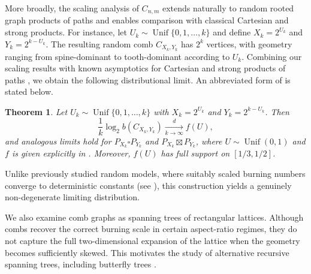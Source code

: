 \documentclass{article}
\def\V#1{{\mathbf #1}}
\def\Unif{\operatorname{Unif}}
\def\B{\operatorname{B}}
\newtheorem{theorem}{Theorem}
\begin{document}
More broadly, the scaling analysis of $C_{n,m}$ extends naturally to random rooted graph products of paths and enables comparison with classical Cartesian and strong products. For instance, let $U_k \sim \Unif\{0,1,\dots,k\}$ and define $X_k = 2^{U_k}$ and $Y_k = 2^{k-U_k}$. The resulting random comb $C_{X_k,Y_k}$ has $2^k$ vertices, with geometry ranging from spine-dominant to tooth-dominant according to $U_k$. Combining our scaling results with known asymptotics for Cartesian and strong products of paths \cite{mitsche2018burning,bonato2021improved}, we obtain the following distributional limit. An abbreviated form of  is stated below.

\begin{theorem}\label{thm: random comb_short}
Let $U_k \sim \Unif\{0,1,\ldots,k\}$ with $X_k = 2^{U_k}$ and $Y_k = 2^{k-U_k}$. Then
\[
\frac1k \log_2 b(C_{X_k,Y_k}) \xrightarrow[k\to\infty]{d} f(U),
\]
and analogous limits hold for $P_{X_k}\square P_{Y_k}$ and $P_{X_k}\boxtimes P_{Y_k}$, where $U \sim \Unif(0,1)$ and $f$ is given explicitly in . Moreover, $f(U)$ has full support on $[1/3,1/2]$.
\end{theorem}

Unlike previously studied random models, where suitably scaled burning numbers converge to deterministic constants (see \cite{devroye2025burning,mitsche2017burning}), this construction yields a genuinely non-degenerate limiting distribution.

We also examine comb graphs as spanning trees of rectangular lattices. Although combs recover the correct burning scale in certain aspect-ratio regimes, they do not capture the full two-dimensional expansion of the lattice when the geometry becomes sufficiently skewed. This motivates the study of alternative recursive spanning trees, including butterfly trees \cite{PZ25,peca2025horton}.





\end{document}
